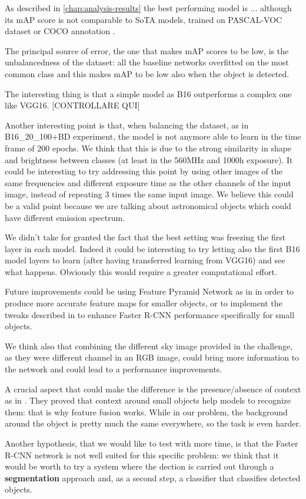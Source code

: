 \documentclass[a4paper,10pt]{report}
\begin{document}
As described in \ref{chap:analysis-results} the best performing model is ...
although its mAP score is not comparable to SoTA models, trained on PASCAL-VOC dataset or COCO annotation \cite{faster-rcnn}.

The principal source of error, the one that makes mAP scores to be low, is the unbalancedness of the dataset: all the baseline networks overfitted on the most common class and this makes mAP to be low also when the object is detected.

The interesting thing is that a simple model as B16 outperforms a complex one like VGG16. [CONTROLLARE QUI]

Another interesting point is that, when balancing the dataset, as in B16\_20\_100+BD experiment, the model is not anymore able to learn in the time frame of 200 epochs. We think that this is due to the strong similarity in shape and brightness between classes (at least in the 560MHz and 1000h exposure). It could be interesting to try addressing this point by using other images of the same frequencies and different exposure time as the other channels of the input image, instead of repeating 3 times the same input image. We believe this could be a valid point because we are talking about astronomical objects which could have different emission spectrum.

We didn't take for granted the fact that the best setting was freezing the first layer in each model. Indeed it could be interesting to try letting also the first B16 model layers to learn (after having transferred learning from VGG16) and see what happens. Obviously this would require a greater computational effort.

Future improvements could be using Feature Pyramid Network as in \cite{fpn} in order to produce more accurate feature maps for smaller objects, or to implement the tweaks described in \cite{frcnn-small-obj} to enhance Faster R-CNN performance specifically for small objects.

We think also that combining the different sky image provided in the challenge, as they were different channel in an RGB image, could bring more information to the network and could lead to a performance improvements.

A crucial aspect that could make the difference is the presence/absence of context as in \cite{small-obj-detection-in-optical-remote-sensing}. They proved that context around small objects help models to recognize them: that is why feature fusion works.
While in our problem, the background around the object is pretty much the same everywhere, so the task is even harder.

Another hypothesis, that we would like to test with more time, is that the Faster R-CNN network is not well suited for this specific problem: we think that it would be worth to try a system where the dection is carried out through a \textbf{segmentation} approach and, as a second step, a classifier that classifies detected objects.

\printbibliography
\end{document}

